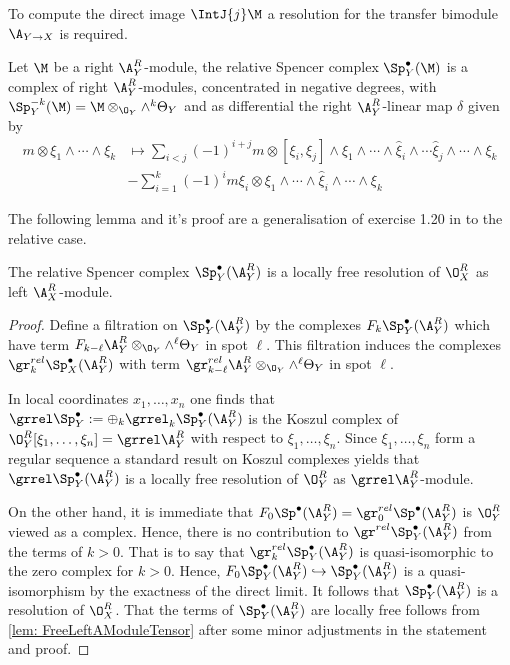To compute the direct image $\IntJ{j} \M$ a resolution for the transfer bimodule $\A_{Y\to X}$ is required.
\begin{definition}
    Let $\M$ be a right $\A_Y^R$-module, the relative Spencer complex $\Sp_Y^\bullet(\M)$ is a complex of right $\A_Y^R$-modules, concentrated in negative degrees, with $\Sp_Y^{-k}(\M) = \M \otimes_{\O_Y} \wedge^{k}\Theta_Y$ and as differential the right $\A_Y^R$-linear map $\delta$ given by
    \begin{align*}
        m\otimes \xi_1 \wedge \cdots \wedge \xi_k &\mapsto \sum_{i<j}(-1)^{i+j} m \otimes [\xi_i,\xi_j]\wedge \xi_1 \wedge \cdots \wedge \hat{\xi}_i \wedge\cdots \hat{\xi}_j \wedge \cdots \wedge \xi_k\\
        &- \sum_{i=1}^k (-1)^{i} m\xi_i \otimes \xi_1 \wedge \cdots \wedge \hat{\xi}_i\wedge \cdots \wedge \xi_k
    \end{align*}
\end{definition}
The following lemma and it's proof are a generalisation of exercise 1.20 in \cite{sabbah2011introduction} to the relative case.
\begin{lemma}\label{lem: RelativeSpencerResolvesOXR}
  The relative Spencer complex $\Sp_Y^\bullet(\A_Y^R)$ is a locally free resolution of $\O_X^R$ as left $\A_X^R$-module.
\end{lemma}
\begin{proof}
  Define a filtration on $\Sp_Y^\bullet(\A_Y^R)$ by the complexes $F_k\Sp_Y^\bullet(\A_Y^R)$ which have term $F_{k-\ell}\A_Y^R\otimes_{\O_Y}\wedge^\ell \Theta_Y$ in spot $\ell$.
  This filtration induces the complexes $\gr_k^{rel} \Sp_X^\bullet(\A_Y^R)$ with term  $\gr_{k-\ell}^{rel}\A_Y^R\otimes_{\O_Y}\wedge^\ell \Theta_Y$ in spot $\ell$.

  In local coordinates $x_1,\ldots, x_n$ one finds that $\grrel\Sp_Y^\bullet := \oplus_k \grrel_k \Sp_Y^\bullet(\A_Y^R)$ is the Koszul complex of $\O_Y^R[\xi_1,\ldots,\xi_n] = \grrel \A_Y^R$ with respect to  $\xi_1,\ldots, \xi_n$.
  Since $\xi_1,\ldots,\xi_n$ form a regular sequence a standard result on Koszul complexes yields that $\grrel\Sp_Y^\bullet(\A_Y^R)$ is a locally free resolution of $\O_Y^R$ as $\grrel \A_Y^R$-module.

  On the other hand, it is immediate that $F_0 \Sp^\bullet(\A_Y^R) = \gr_0^{rel}\Sp^\bullet(\A_Y^R)$ is  $\O_Y^R$ viewed as a complex. Hence, there is no contribution to $\gr^{rel}\Sp_Y^\bullet(\A_Y^R)$ from the terms of $k>0$.
  That is to say that $\gr_k^{rel}\Sp_Y^\bullet(\A_Y^R)$ is quasi-isomorphic to the zero complex for $k>0$.
  Hence, $F_0\Sp_Y^\bullet(\A_Y^R)\hookrightarrow \Sp_Y^\bullet(\A_Y^R)$ is a quasi-isomorphism by the exactness of the direct limit.
  It follows that  $\Sp_Y^\bullet(\A_Y^R)$ is a resolution of $\O_X^R$.
  That the terms of $\Sp_Y^\bullet(\A_Y^R)$ are locally free follows from \cref{lem: FreeLeftAModuleTensor} after some minor adjustments in the statement and proof.
\end{proof}

